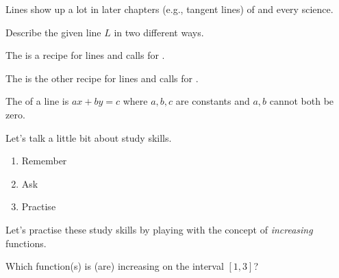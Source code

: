 \documentclass[../main.tex]{subfiles}
\begin{document}
\clearpage

Lines show up a lot in later chapters (e.g., tangent lines) of \thiscourse{} and every science.

\begin{example}
  Describe the given line \(L\)  in two different ways.

  
\end{example}

The  is a recipe for lines and calls for \underline{\hspace{3in}}.


The  is the other recipe for lines and calls for \underline{\hspace{2in}}.


The  of a line is \(ax + by = c\) where \(a, b, c\) are constants and \(a,b\) cannot both be zero.


\clearpage

Let's talk a little bit about study skills. 

\begin{mdframed}[style=simple]
  \begin{enumerate}
    \item Remember \underline{\hspace{4in}}
    \item Ask \underline{\hspace{4.5in}}
    \item Practise \underline{\hspace{4.2in}} 
  \end{enumerate}
\end{mdframed}

\begin{example}
  Let's practise these study skills by playing with the concept of \emph{increasing} functions.

  \faComments{} Which function(s) is (are) increasing on the interval \([1,3]\)?

  \begin{center}
    
    \quad
    
    \quad
    
  \end{center}
\end{example}
\end{document}
